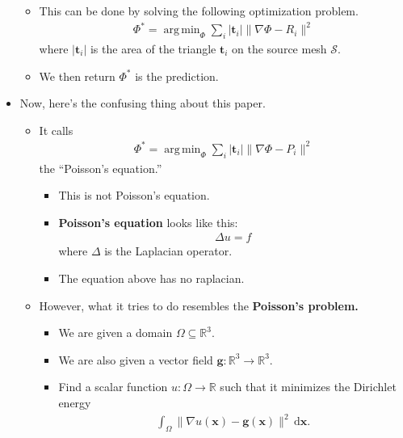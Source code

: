 \documentclass[10pt]{article}
\newcommand{\dee}{\mathrm{d}}
\newcommand{\ve}[1]{\mathbf{#1}}
\newcommand{\ra}{\rightarrow}
\newcommand{\mcal}[1]{\mathcal{#1}}
\newcommand{\Real}{\mathbb{R}}
\DeclareMathOperator*{\argmin}{arg\,min}
\begin{document}
\begin{itemize}
\begin{itemize}
        \item This can be done by solving the following optimization problem.
        \begin{align*}
            \Phi^* = \argmin_{\Phi} \sum_{i} |\ve{t}_i| \big\| \nabla \Phi - R_i \big\|^2
        \end{align*}
        where $|\ve{t}_i|$ is the area of the triangle $\ve{t}_i$ on the source mesh $\mcal{S}$.
        
        \item We then return $\Phi^*$ is the prediction.
    \end{itemize}

    \item Now, here's the confusing thing about this paper.
    
    \begin{itemize}
        \item It calls 
        \begin{align*}
            \Phi^* = \argmin_{\Phi} \sum_{i} |\ve{t}_i| \big\| \nabla \Phi - P_i \big\|^2
        \end{align*}
        the ``Poisson's equation.''
        \begin{itemize}
            \item This is not Poisson's equation.
            \item {\bf Poisson's equation} looks like this:
            \begin{align*}
                \Delta u = f
            \end{align*}
            where $\Delta$ is the Laplacian operator.
            \item The equation above has no raplacian.
        \end{itemize}

        \item However, what it tries to do resembles the {\bf Poisson's problem.}
        \begin{itemize}
            \item We are given a domain $\Omega \subseteq \Real^3$.
            \item We are also given a vector field $\ve{g}: \Real^3 \ra \Real^3$.
            \item Find a scalar function $u: \Omega \ra \Real$ such that it minimizes the Dirichlet energy
            \begin{align*}
                \int_\Omega \| \nabla u(\ve{x}) - \ve{g}(\ve{x}) \|^2\, \dee\ve{x}.
            \end{align*}            
        \end{itemize}


\end{itemize}
\end{itemize}
\end{document}
